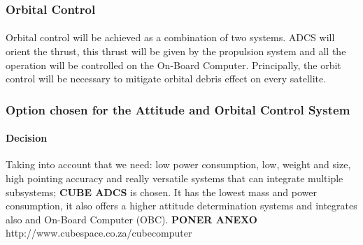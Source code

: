 \subsubsection{Orbital Control}
\paragraph{} Orbital control will be achieved as a combination of two systems. ADCS will orient the thrust, this thrust will be given by the propulsion system and all the operation will be controlled on the On-Board Computer. Principally, the orbit control will be necessary to mitigate orbital debris effect on every satellite.

\subsubsection{Option chosen for the Attitude and Orbital Control System}

\paragraph{Decision} 
Taking into account that we need: low power consumption, low, weight and size, high pointing accuracy and really versatile systems that can integrate multiple subsystems; \textbf{CUBE ADCS} is chosen. It has the lowest mass and power consumption, it also offers a higher attitude determination systems and integrates also and On-Board Computer (OBC). \textbf{PONER ANEXO}
http://www.cubespace.co.za/cubecomputer 


